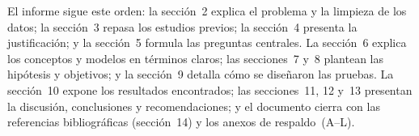 El informe sigue este orden: la sección~2 explica el problema y la limpieza de los datos; la sección~3 repasa los estudios previos; la sección~4 presenta la justificación; y la sección~5 formula las preguntas centrales. La sección~6 explica los conceptos y modelos en términos claros; las secciones~7 y~8 plantean las hipótesis y objetivos; y la sección~9 detalla cómo se diseñaron las pruebas. La sección~10 expone los resultados encontrados; las secciones~11, 12 y~13 presentan la discusión, conclusiones y recomendaciones; y el documento cierra con las referencias bibliográficas (sección~14) y los anexos de respaldo~(A--L).
